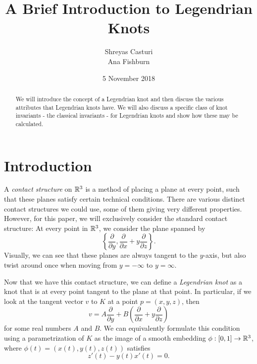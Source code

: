 \documentclass{article}
\title{A Brief Introduction to Legendrian Knots}
\author{Shreyas Casturi\\Ana Fishburn}
\date{5 November 2018}
\begin{document}
\maketitle

\begin{abstract}
    We will introduce the concept of a Legendrian knot and then discuss
    the various attributes that Legendrian knots have. %
    We will also discuss
    a specific class of knot invariants - the classical invariants - for
    Legendrian knots and show how these may be calculated.
\end{abstract}

\section{Introduction}
A {\it contact structure} on $\mathbb{R}^3$ is a method of placing a plane at every point,
such that these planes satisfy certain technical conditions.
There are various distinct contact structures we could use, some of them giving
very different properties.
However, for this paper, we will exclusively consider the standard contact structure:
At every point in $\mathbb{R}^3$, we consider the plane spanned by
\[\left\{\frac{\partial}{\partial y},\frac{\partial}{\partial x} + y\frac{\partial}{\partial z}\right\}.\]
Visually, we can see that these planes are always tangent to the $y$-axis, but also
twist around once when moving from $y = -\infty$ to $y = \infty$.

Now that we have this contact structure, we can define a {\it Legendrian knot}
as a knot that is at every point tangent to the plane at that point.
In particular, if we look at the tangent vector $v$ to $K$ at a point $p = (x,y,z)$,
then
\[ v = A\frac{\partial}{\partial y} + B\left(\frac{\partial}{\partial x} +y\frac{\partial}{\partial z}\right)\]
for some real numbers $A$ and $B$.
We can equivalently formulate this condition using a parametrization of $K$ as
the image of a smooth embedding $\phi : [0,1] \to \mathbb{R}^3$, where $\phi(t) = (x(t),y(t),z(t))$ satisfies
\[ z'(t)-y(t)x'(t) = 0.\]
\end{document}
